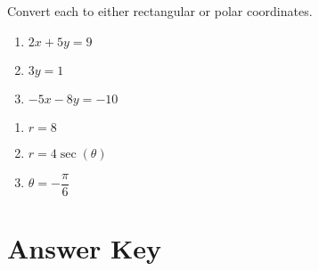 Convert each to either rectangular or polar coordinates.
\begin{multicols}{3}
\begin{enumerate}		\setcounter{enumi}{\value{Review}}
	\item $2x + 5y = 9$
    \item $3y = 1$
    \item $-5x - 8y = -10$
\end{enumerate}	\setcounter{Review}{\value{enumi}}
\end{multicols}
\begin{multicols}{3}
\begin{enumerate}	\setcounter{enumi}{\value{Review}}
    \item $r = 8$
    \item $r = 4\sec(\theta)$
    \item $\theta = -\dfrac{\pi}{6}$
\end{enumerate}	\setcounter{Review}{\value{enumi}}
\end{multicols}

\newpage

\section{Answer Key}

